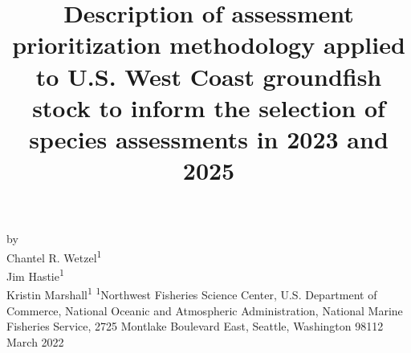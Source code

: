 \documentclass[11pt,
  english,
  a4paper,
]{article}
\date{}
\newcommand{\trTitle}{Description of assessment prioritization methodology applied to U.S. West Coast groundfish stock to inform the selection of species assessments in 2023 and 2025}
\newcommand{\trYear}{2022}
\newcommand{\trMonth}{March}
\newcommand{\trAuthsBack}{Wetzel, C.R., J. Hastie, K. Marshall}
\newcommand{\trCitation}{
\begin{hangparas}{1em}{1}
\trAuthsBack{}. \trYear{}. \trTitle{}. \glsentrylong{pfmc}, Portland, Oregon. \pageref{LastPage}{}\,p.
\end{hangparas}}
\begin{document}

\renewcommand*{\thefootnote}{\fnsymbol{footnote}}

\small
\thispagestyle{empty}
\noindent
\begin{center}
\title{Description of assessment prioritization methodology applied to U.S. West Coast groundfish stock to inform the selection of species assessments in 2023 and 2025}
\vspace{1.5cm}
{\Large\textbf{}}
\vfill
by\\
Chantel R. Wetzel\textsuperscript{1}\\
Jim Hastie\textsuperscript{1}\\
Kristin Marshall\textsuperscript{1}\vfill
\textsuperscript{1}Northwest Fisheries Science Center, U.S. Department of Commerce, National Oceanic and Atmospheric Administration, National Marine Fisheries Service, 2725 Montlake Boulevard East, Seattle, Washington 98112\vfill
\trMonth{} \trYear{}
\end{center}
\clearpage



\tableofcontents\clearpage
\label{TRlastRoman}
\clearpage

\newpage
\thispagestyle{empty} %

\pagestyle{plain}  %
\renewcommand*{\thefootnote}{\arabic{footnote}}  %
\setcounter{footnote}{0}  %
\renewcommand{\headrulewidth}{0.5pt}
\renewcommand{\footrulewidth}{0.5pt}
\end{document}

